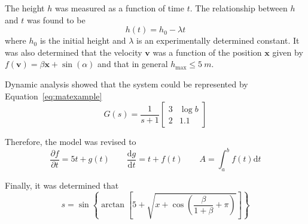 \documentclass[a5paper, 10pt]{article}
\begin{document}
The height $h$ was measured as a function of time $t$.  The relationship between $h$ and $t$ was found to be 
\begin{equation}
  \label{eq:commaexample}
  h(t) = h_0 - \lambda t
\end{equation}
where $h_0$ is the initial height and $\lambda$ is an experimentally
determined constant.  It was also determined that the velocity
$\mathbf{v}$ was a function of the position $\mathbf{x}$ given by
$f(\mathbf{v}) = \beta \mathbf{x} + \sin(\alpha)$ and that in general
$h_{\mathrm{max}} \leq \SI{5}{m}$.

Dynamic analysis showed that the system could be represented by
Equation~\ref{eq:matexample}
\begin{equation}
  \label{eq:matexample}
  G(s) = \frac{1}{s+1}\left [ 
    \begin{array}{cc} 
      3 & \log{b} \\ 
      2 & \num{1.1} 
    \end{array} \right ]
\end{equation}

Therefore, the model was revised to
\begin{equation}
  \frac{\partial f}{\partial t} = 5t + g(t) \qquad \frac{\mathrm{d} g}{\mathrm{d} t} = t + f(t) \qquad A = \int_a^b f(t) \mathrm{d} t
\end{equation}

Finally, it was determined that
\begin{equation}
  s = \sin\left \{ \arctan \left [  5 +  \sqrt{x + \cos\left(\frac{\beta}{1+\beta} + \pi\right)} \right ] \right \}
\end{equation}
\end{document}
